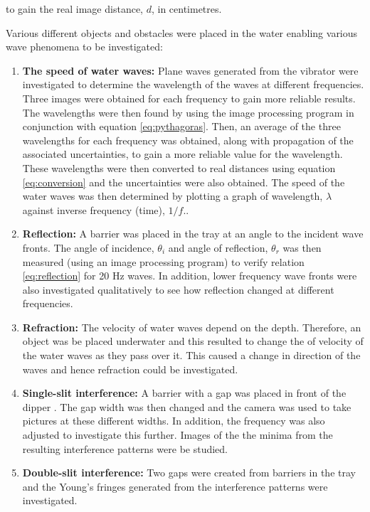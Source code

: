 \documentclass{article}
\begin{document}
\vspace{2mm}
\noindent
to gain the real image distance, $d$, in centimetres.

\newpage
\vspace{2mm}
\noindent
Various different objects and obstacles were placed in the water enabling various wave phenomena to be investigated:

\begin{enumerate}
  \item \textbf{The speed of water waves:} Plane waves generated from the vibrator were investigated to determine the wavelength of the waves at different frequencies. Three images were obtained for each frequency to gain more reliable results. The wavelengths were then found by using the image processing program in conjunction with equation \eqref{eq:pythagoras}. Then, an average of the three wavelengths for each frequency was obtained, along with propagation of the associated uncertainties, to gain a more reliable value for the wavelength. These wavelengths were then converted to real distances using equation \eqref{eq:conversion} and the uncertainties were also obtained. The speed of the water waves was then determined by plotting a graph of wavelength, $\lambda$ against inverse frequency (time), $1/f$..
  \item \textbf{Reflection:} A barrier was placed in the tray at an angle to the incident wave fronts. The angle of incidence, $\theta_i$ and angle of reflection, $\theta_r$ was then measured (using an image processing program) to verify relation \eqref{eq:reflection} for 20 Hz waves. In addition, lower frequency wave fronts were also investigated qualitatively to see how reflection changed at different frequencies.
  \item \textbf{Refraction:} The velocity of water waves depend on the depth. Therefore, an object was be placed underwater and this resulted to change the of velocity of the water waves as they pass over it. This caused a change in direction of the waves and hence refraction could be investigated.
  \item \textbf{Single-slit interference:} A barrier with a gap was placed in front of the dipper \cite{Paper01}. The gap width was then changed and the camera was used to take pictures at these different widths. In addition, the frequency was also adjusted to investigate this further. Images of the the minima from the resulting interference patterns were be studied.
  \item \textbf{Double-slit interference:} Two gaps were created from barriers in the tray and the Young's fringes generated from the interference patterns were investigated. 

\end{enumerate}
\end{document}
